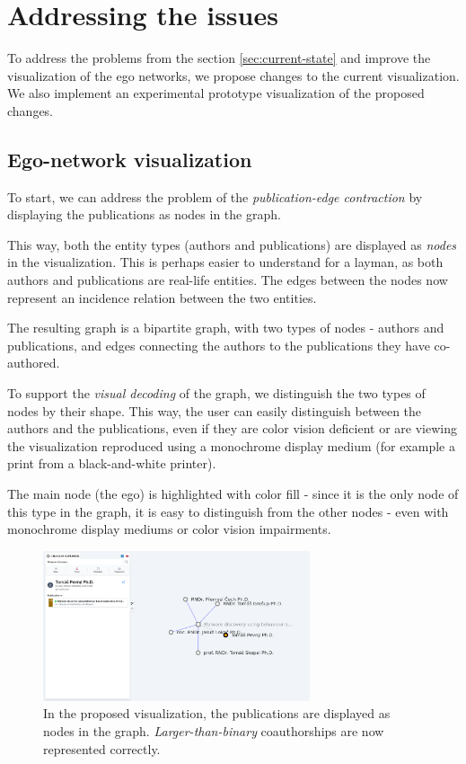 \section{Addressing the issues}

To address the problems from the section \ref{sec:current-state} and improve the visualization of the ego networks, we propose changes to the current visualization.
We also implement an experimental prototype visualization of the proposed changes.

\subsection{Ego-network visualization}

To start, we can address the problem of the \textit{publication-edge contraction} by displaying the publications as nodes in the graph.

This way, both the entity types (authors and publications) are displayed as \textit{nodes} in the visualization.
This is perhaps easier to understand for a layman, as both authors and publications are real-life entities. 
The edges between the nodes now represent an incidence relation between the two entities.

The resulting graph is a bipartite graph, with two types of nodes - authors and publications, and edges connecting the authors to the publications they have co-authored.

To support the \textit{visual decoding} of the graph, we distinguish the two types of nodes by their shape. 
This way, the user can easily distinguish between the authors and the publications, even if they are color vision deficient 
or are viewing the visualization reproduced using a monochrome display medium (for example a print from a black-and-white printer).

The main node (the ego) is highlighted with color fill - since it is the only node of this type in the graph,
it is easy to distinguish from the other nodes - even with monochrome display mediums or color vision impairments.

\begin{figure}[ht!]
    \captionsetup{width=.9\linewidth}
    \includegraphics[width=0.7\textwidth]{../img/publications-and-people.png}
    \centering
    \caption{In the proposed visualization, the publications are displayed as nodes in the graph. \textit{Larger-than-binary} coauthorships are now represented correctly.}
\end{figure}

